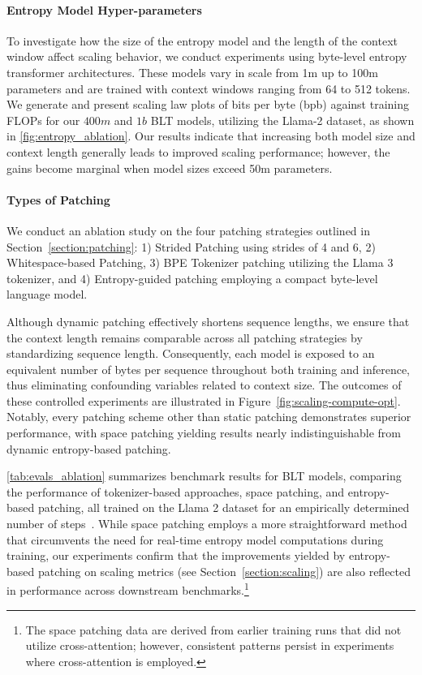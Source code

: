 \paragraph{Entropy Model Hyper-parameters} To investigate how the size of the entropy model and the length of the context window affect scaling behavior, we conduct experiments using byte-level entropy transformer architectures. These models vary in scale from 1m up to 100m parameters and are trained with context windows ranging from 64 to 512 tokens. We generate and present scaling law plots of bits per byte (bpb) against training FLOPs for our $400m$ and $1b$ {\textsc BLT} models, utilizing the Llama-2 dataset, as shown in \autoref{fig:entropy_ablation}. Our results indicate that increasing both model size and context length generally leads to improved scaling performance; however, the gains become marginal when model sizes exceed 50m parameters.

\paragraph{Types of Patching}

We conduct an ablation study on the four patching strategies outlined in Section~\ref{section:patching}: 1) Strided Patching using strides of 4 and 6, 2) Whitespace-based Patching, 3) BPE Tokenizer patching utilizing the Llama 3 tokenizer, and 4) Entropy-guided patching employing a compact byte-level language model.

Although dynamic patching effectively shortens sequence lengths, we ensure that the context length remains comparable across all patching strategies by standardizing sequence length. Consequently, each model is exposed to an equivalent number of bytes per sequence throughout both training and inference, thus eliminating confounding variables related to context size. The outcomes of these controlled experiments are illustrated in Figure~\ref{fig:scaling-compute-opt}. Notably, every patching scheme other than static patching demonstrates superior performance, with space patching yielding results nearly indistinguishable from dynamic entropy-based patching.

\autoref{tab:evals_ablation} summarizes benchmark results for {\textsc BLT} models, comparing the performance of tokenizer-based approaches, space patching, and entropy-based patching, all trained on the Llama 2 dataset for an empirically determined number of steps~\citep{dubey2024llama}. While space patching employs a more straightforward method that circumvents the need for real-time entropy model computations during training, our experiments confirm that the improvements yielded by entropy-based patching on scaling metrics (see Section~\ref{section:scaling}) are also reflected in performance across downstream benchmarks.\footnote{The space patching data are derived from earlier training runs that did not utilize cross-attention; however, consistent patterns persist in experiments where cross-attention is employed.}

